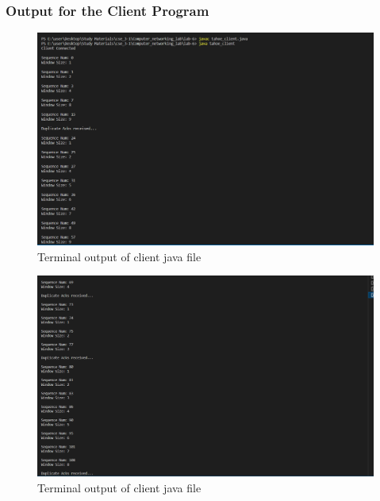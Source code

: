 \documentclass[11pt]{article}
\begin{document}
\subsubsection{Output for the Client Program}

  \begin{figure}[!h]
\centering
\includegraphics[width=\textwidth]{t_client1.png}
\caption{Terminal output of client java file }
\end{figure}
\FloatBarrier

 \begin{figure}[!h]
\centering
\includegraphics[width=\textwidth]{t_client2.png}
\caption{Terminal output of client java file }
\end{figure}
\FloatBarrier
\end{document}
